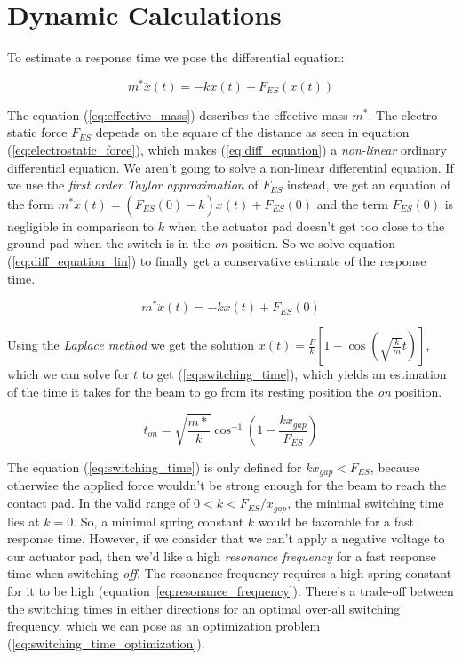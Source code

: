 \appendix
\section{Dynamic Calculations}

To estimate a response time we pose the differential equation:

\begin{equation}
    m^* \ddot{x}(t) = -kx(t) + F_{ES}(x(t))
    \label{eq:diff_equation}
\end{equation}

The equation (\ref{eq:effective_mass}) describes the effective mass $m^*$.
The electro static force $F_{ES}$ depends on the square of the distance as seen in equation (\ref{eq:electrostatic_force}), which makes (\ref{eq:diff_equation}) a \emph{non-linear} ordinary differential equation.
We aren't going to solve a non-linear differential equation.
If we use the \emph{first order Taylor approximation} of $F_{ES}$ instead, we get an equation of the form $m^* \ddot{x}(t) = (\dot{F}_{ES}(0) - k) x(t) + F_{ES}(0)$ and the term $\dot{F}_{ES}(0)$ is negligible in comparison to $k$ when the actuator pad doesn't get too close to the ground pad when the switch is in the \emph{on} position.
So we solve equation (\ref{eq:diff_equation_lin}) to finally get a conservative estimate of the response time.

\begin{equation}
    m^* \ddot{x}(t) = -kx(t) + F_{ES}(0)
    \label{eq:diff_equation_lin}
\end{equation}

Using the \emph{Laplace method} we get the solution $x(t) = \frac{F}{k}\left[1-\cos{\left(\sqrt{\frac{k}{m}}t\right)}\right]$, which we can solve for $t$ to get (\ref{eq:switching_time}), which yields an estimation of the time it takes for the beam to go from its resting position the \emph{on} position.

\begin{equation}
    t_{on} = \sqrt{\frac{m*}{k}} \cos^{-1}{\left( 1 - \frac{k x_{gap}}{F_{ES}} \right)} 
    \label{eq:switching_time}
\end{equation}

The equation (\ref{eq:switching_time}) is only defined for $k x_{gap} < F_{ES}$, because otherwise the applied force wouldn't be strong enough for the beam to reach the contact pad.
In the valid range of $0 < k < F_{ES}/x_{gap}$, the minimal switching time lies at $k = 0$.
So, a minimal spring constant $k$ would be favorable for a fast response time.
However, if we consider that we can't apply a negative voltage to our actuator pad, then we'd like a high \emph{resonance frequency} for a fast response time when switching \emph{off}.
The resonance frequency requires a high spring constant for it to be high (equation~\ref{eq:resonance_frequency}).
There's a trade-off between the switching times in either directions for an optimal over-all switching frequency, which we can pose as an optimization problem (\ref{eq:switching_time_optimization}).


